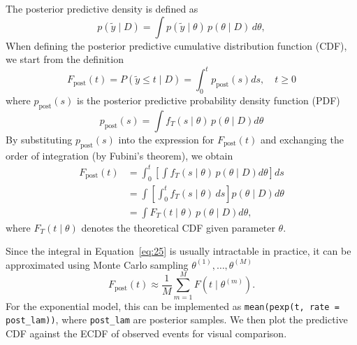 The posterior predictive density is defined as
\begin{equation}
    p(\tilde{y} \mid D) = \int p(\tilde{y} \mid \theta) \, p(\theta \mid D) \, d\theta,
\end{equation}
When defining the posterior predictive cumulative distribution function (CDF), we start from the definition
\begin{equation}
F_{\text{post}}(t)
= P(\tilde{y} \le t \mid D)
= \int_0^{t} p_{\text{post}}(s) ds, \quad t\ge 0
\end{equation}
where $p_{\text{post}}(s)$ is the posterior predictive probability density function (PDF)
\begin{equation}
p_{\text{post}}(s)
= \int f_T(s\mid\theta)\,p(\theta \mid D) d\theta
\end{equation}
By substituting $p_{\text{post}}(s)$ into the expression for $F_{\text{post}}(t)$ and exchanging the order of integration (by Fubini's theorem), we obtain
\begin{align}
F_{\text{post}}(t)
&= \int_0^{t} 
\left[ \int f_T(s\mid\theta)\,p(\theta \mid D) d\theta \right] ds \\[6pt]
&= \int \left[ \int_0^{t} f_T(s\mid\theta)\, ds \right] p(\theta \mid D) d\theta \\[6pt]
&= \int F_T(t\mid\theta)\, p(\theta \mid D) d\theta,
\label{eq:25}
\end{align}
where $F_T(t\mid\theta)$ denotes the theoretical CDF given parameter $\theta$.

Since the integral in Equation~\eqref{eq:25} is usually intractable in practice, it can be approximated using Monte Carlo sampling $\theta^{(1)}, \dots, \theta^{(M)}$
\begin{equation}
    F_{\text{post}}(t) \approx \frac{1}{M} \sum_{m=1}^M F(t \mid \theta^{(m)}).
\end{equation}
For the exponential model, this can be implemented as \texttt{mean(pexp(t, rate = post\_lam))}, where \texttt{post\_lam} are posterior samples. We then plot the predictive CDF against the ECDF of observed events for visual comparison.






